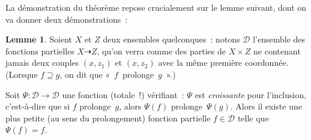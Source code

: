 \documentclass[12pt,a4paper]{article}
\theoremstyle{definition}
\newtheorem{lem}[comcnt]{Lemme}
\begin{document}
La démonstration du théorème repose crucialement sur le lemme suivant,
dont on va donner deux démonstrations :
\begin{lem}\label{fixed-point-lemma-for-partial-functions}
Soient $X$ et $Z$ deux ensembles quelconques : notons $\mathscr{D}$
l'ensemble des fonctions partielles $X\dasharrow Z$, qu'on verra comme
des parties de $X\times Z$ ne contenant jamais deux couples $(x,z_1)$
et $(x,z_2)$ avec la même première coordonnée.  (Lorsque $f\supseteq
g$, on dit que « $f$ prolonge $g$ ».)

Soit $\Psi \colon \mathscr{D} \to \mathscr{D}$ une fonction (totale !)
vérifiant : $\Psi$ est \emph{croissante} pour l'inclusion,
c'est-à-dire que si $f$ prolonge $g$, alors $\Psi(f)$
prolonge $\Psi(g)$.  Alors il existe une plus petite (au sens du
prolongement) fonction partielle $f \in \mathscr{D}$ telle que
$\Psi(f) = f$.
\end{lem}
\end{document}
